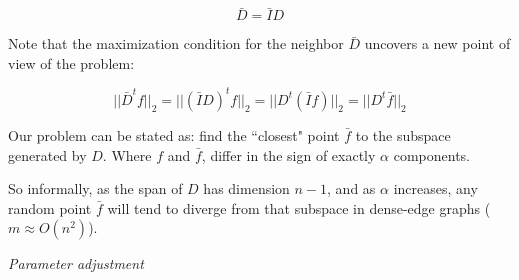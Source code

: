 \documentclass[a4paper,11pt]{article}
\begin{document}
$$\bar{D} = \bar{I} D$$

Note that the maximization condition for the neighbor $\bar{D}$ uncovers 
a new point of view of the problem:

$$||\bar{D}^tf||_2 = ||(\bar{I} D)^t f||_2 = ||D^t (\bar{I} f)||_2 = 
||D^t \bar{f}||_2$$

Our problem can be stated as: find the ``closest" point $\bar{f}$ to 
the subspace generated by $D$. Where $f$ and $\bar{f}$, differ in the 
sign of exactly $\alpha$ components.

\bigskip

So informally, as the span of $D$ has dimension $n-1$, and as $\alpha$ 
increases, any random point $\bar{f}$ will tend to diverge from that 
subspace in dense-edge graphs ($m \approx O(n^2)$).

\bigskip

\emph{Parameter adjustment}
\end{document}
